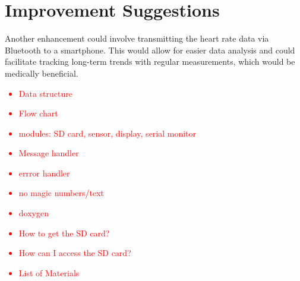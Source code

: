 \section{Improvement Suggestions}

Another enhancement could involve transmitting the heart rate data via Bluetooth to a smartphone. This would allow for easier data analysis and could facilitate tracking long-term trends with regular measurements, which would be medically beneficial.

\textcolor{red}{
\begin{itemize}
    \item Data structure
    \item Flow chart
    \item modules: SD card, sensor, display, serial monitor
    \item Message handler
    \item errror handler
    \item no magic numbers/text
    \item doxygen
    \item How to get the SD card?
    \item How can I access the SD card?
    \item List of Materials
\end{itemize}
}


